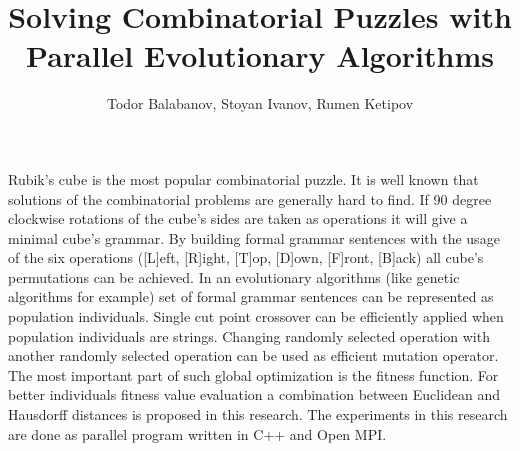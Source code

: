 \documentclass[12pt,a4paper]{article}
\title{Solving Combinatorial Puzzles with Parallel Evolutionary Algorithms}
\author{Todor Balabanov, Stoyan Ivanov, Rumen Ketipov}
\date{\empty}
\begin{document}
 
\maketitle

Rubik's cube is the most popular combinatorial puzzle. It is well known that solutions of the combinatorial problems are generally hard to find. If 90 degree clockwise rotations of the cube's sides are taken as operations it will give a minimal cube's grammar. By building formal grammar sentences with the usage of the six operations ([L]eft, [R]ight, [T]op, [D]own, [F]ront, [B]ack) all cube's permutations can be achieved. In an evolutionary algorithms (like genetic algorithms for example) set of formal grammar sentences can be represented as population individuals. Single cut point crossover can be efficiently applied when population individuals are strings. Changing randomly selected operation with another randomly selected operation can be used as efficient mutation operator. The most important part of such global optimization is the fitness function. For better individuals fitness value evaluation a combination between Euclidean and Hausdorff distances is proposed in this research. The experiments in this research are done as parallel program written in C++ and Open MPI.
\end{document}
